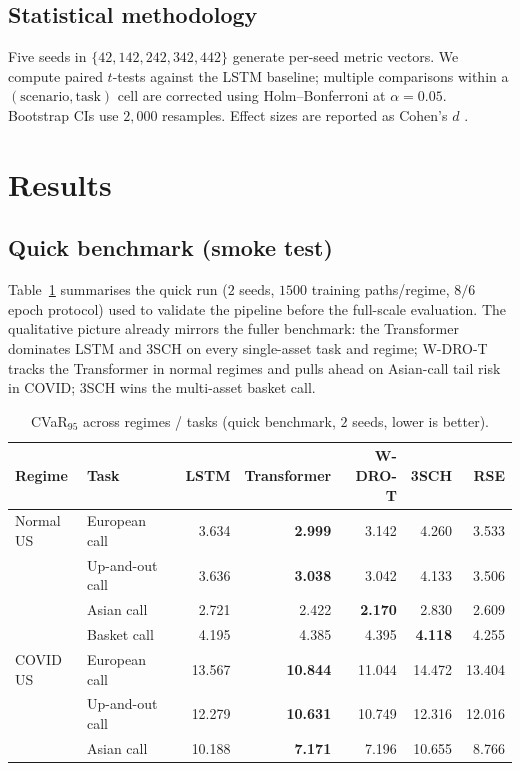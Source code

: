 \documentclass[11pt,a4paper]{article}
\begin{document}
\subsection{Statistical methodology}
Five seeds in $\{42,142,242,342,442\}$ generate per-seed metric vectors.
We compute paired $t$-tests against the LSTM baseline; multiple comparisons
within a $(\text{scenario}, \text{task})$ cell are corrected using
Holm--Bonferroni \citep{holm1979simple} at $\alpha=0.05$.  Bootstrap CIs
\citep{efron1979bootstrap} use $2{,}000$ resamples.  Effect sizes are
reported as Cohen's $d$ \citep{cohen1988statistical}.

\section{Results}\label{sec:results}

\subsection{Quick benchmark (smoke test)}\label{sec:results_quick}

Table~\ref{tab:quick} summarises the quick run ($2$ seeds, $1500$ training
paths/regime, $8/6$ epoch protocol) used to validate the pipeline before
the full-scale evaluation.  The qualitative picture already mirrors the
fuller benchmark: the Transformer dominates LSTM and 3SCH on every
single-asset task and regime; W-DRO-T tracks the Transformer in normal
regimes and pulls ahead on Asian-call tail risk in COVID; 3SCH wins the
multi-asset basket call.

\begin{table}[h]
\centering\scriptsize
\caption{CVaR$_{95}$ across regimes / tasks (quick benchmark, $2$ seeds, lower is better).}
\label{tab:quick}
\begin{tabular}{lllrrrrr}
\toprule
Regime & Task & & LSTM & Transformer & W-DRO-T & 3SCH & RSE \\\midrule
Normal US     & European call & & 3.634 & \textbf{2.999} & 3.142 & 4.260 & 3.533 \\
              & Up-and-out call & & 3.636 & \textbf{3.038} & 3.042 & 4.133 & 3.506 \\
              & Asian call    & & 2.721 & 2.422 & \textbf{2.170} & 2.830 & 2.609 \\
              & Basket call   & & 4.195 & 4.385 & 4.395 & \textbf{4.118} & 4.255 \\\midrule
COVID US      & European call & & 13.567 & \textbf{10.844} & 11.044 & 14.472 & 13.404 \\
              & Up-and-out call & & 12.279 & \textbf{10.631} & 10.749 & 12.316 & 12.016 \\
              & Asian call    & & 10.188 & \textbf{7.171} & 7.196 & 10.655 & 8.766 \\
\bottomrule
\end{tabular}
\end{table}
\end{document}
